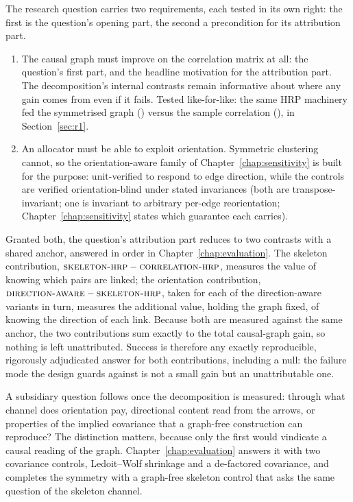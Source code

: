 \noindent The research question carries two requirements, each tested in
its own right: the first is the question's opening part, the second a
precondition for its attribution part.
\begin{enumerate}[label=Requirement \arabic*., itemsep=1pt, topsep=3pt]
  \item The causal graph must improve on the correlation matrix
    at all: the question's first part, and the headline motivation for
    the attribution part. The decomposition's internal contrasts remain
    informative about where any gain comes from even if it fails.
    Tested like-for-like: the
    same HRP machinery fed the symmetrised graph (\skelsamp{}) versus the sample
    correlation (\HRP{}), in Section~\ref{sec:r1}.
  \item An allocator must be able to exploit orientation. Symmetric
    clustering cannot, so the orientation-aware family of
    Chapter~\ref{chap:sensitivity} is built for the purpose: unit-verified to
    respond to edge direction, while the controls are verified
    orientation-blind under stated invariances (both are transpose-invariant;
    one is invariant to arbitrary per-edge reorientation;
    Chapter~\ref{chap:sensitivity} states which guarantee each carries).
\end{enumerate}

\noindent Granted both, the question's attribution part reduces to two
contrasts with a
shared anchor,
answered in order in Chapter~\ref{chap:evaluation}. The skeleton
contribution, $\textsc{skeleton-hrp}{}-\textsc{correlation-hrp}{}$, measures the value of knowing which
pairs are
linked; the orientation contribution, $\textsc{direction-aware}{}-\textsc{skeleton-hrp}{}$,
taken for each of the direction-aware variants in turn, measures the
additional value,
holding the graph fixed, of knowing the direction of each link. Because
both are measured against the same anchor, the two contributions sum
exactly to the total causal-graph gain, so nothing is left unattributed.
Success is therefore any exactly reproducible, rigorously adjudicated answer
for both contributions, including a null: the failure mode the design guards
against is not a small gain but an unattributable one.

A subsidiary question follows once the decomposition is measured: through
what channel does orientation pay, directional content read from the
arrows, or properties of the implied covariance that a graph-free
construction can reproduce? The distinction matters, because only the
first would vindicate a causal reading of the graph.
Chapter~\ref{chap:evaluation} answers it with two covariance controls,
Ledoit--Wolf
shrinkage and a de-factored covariance, and completes the symmetry with a
graph-free skeleton control that asks the same question of the skeleton
channel.

